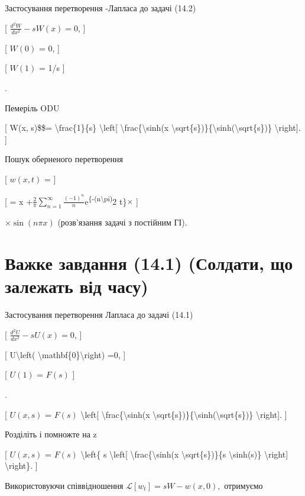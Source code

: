 \documentclass[
]{article}
\begin{document}
{{Застосування перетворення -Лапласа до задачі (14.2)

{[} \(\frac{d^2W}{dx^2} - sW(x) = 0\), {]}

{[} \(W(0)\) = 0, {]}

{[} \(W(1)\) = 1/s {]}

.

Пемеріль ODU

{[} W(x, s)\$\$= \textbackslash frac\{1\}\{s\} \textbackslash left{[}
\textbackslash frac\{\textbackslash sinh(x
\textbackslash sqrt\{s\})\}\{\textbackslash sinh(\textbackslash sqrt\{s\})\}
\textbackslash right{]}. {]}

Пошук оберненого перетворення

{[} \(w(x, t)\) = {]}

{[} = x
+\(\frac{2}{\pi} \sum_{n=1}^{\infty} \frac{(-1)^n}{n}\)e\textsuperscript{\{-(n\textbackslash pi)}2
t\}\(\times\) {]}

\(\times \sin(n\pi x)\) (розв'язання задачі з постійним ГІ).

\section{Важке завдання (14.1) (Солдати, що залежать від
часу)}\label{ux432ux430ux436ux43aux435-ux437ux430ux432ux434ux430ux43dux43dux44f-14.1-ux441ux43eux43bux434ux430ux442ux438-ux449ux43e-ux437ux430ux43bux435ux436ux430ux442ux44c-ux432ux456ux434-ux447ux430ux441ux443}

Застосування перетворення Лапласа до задачі (14.1)

{[} \(\frac{d^2U}{dx^2} - sU(x) = 0\), {]}

{[} U\textbackslash left(
\textbackslash mathbf\{0\}\textbackslash right) =0, {]}

{[} \(U(1)\) = \(F(s)\) {]}

.

{[} \(U(x, s)\) = \(F(s)\) \textbackslash left{[}
\textbackslash frac\{\textbackslash sinh(x
\textbackslash sqrt\{s\})\}\{\textbackslash sinh(\textbackslash sqrt\{s\})\}
\textbackslash right{]}. {]}

Розділіть і помножте на z

{[} \(U(x, s)\) = \(F(s)\) \textbackslash left\{ s
\textbackslash left{[} \textbackslash frac\{\textbackslash sinh(x
\textbackslash sqrt\{s\})\}\{s \textbackslash sinh(s)\}
\textbackslash right{]} \textbackslash right\}. {]}

Використовуючи співвідношення \(\mathscr{L}[w_t] = sW - w(x, 0),\)
отримуємо

}}
\end{document}
